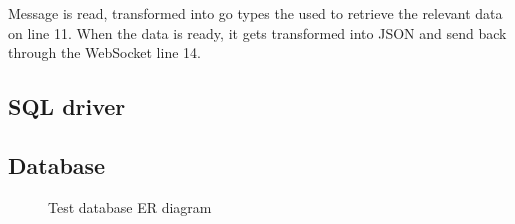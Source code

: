 Message is read, transformed into go types the used to retrieve the relevant data on line 11. When the data is ready, it gets transformed into JSON and send back through the WebSocket line 14.

\subsection{SQL driver}
\todo{}
\subsection{Database}\label{sec:database}
\todo{}

\begin{sidewaysfigure}
  \centering
  \caption{Test database ER diagram}
  \label{fig:databaseer}
\end{sidewaysfigure}
